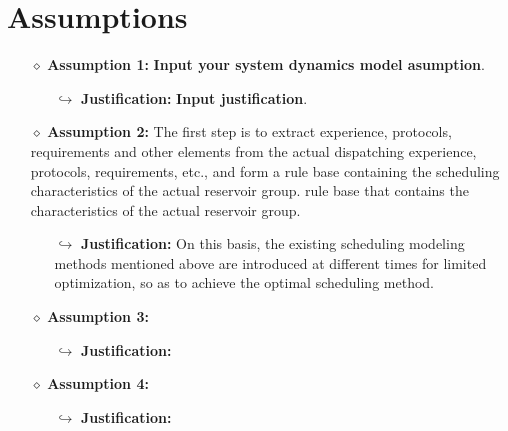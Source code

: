 \section{Assumptions}
\begin{itemize}
  \item[$\diamond$] \textbf{Assumption 1:} \textbf{Input your system dynamics model asumption}.
        \begin{itemize}
          \item[$\hookrightarrow$] \textbf{Justification:} \textbf{Input justification}.
        \end{itemize}
  \item[$\diamond$] \textbf{Assumption 2:} The first step is to extract experience, protocols, requirements and other elements from the actual dispatching experience, protocols, requirements, etc., and form a rule base containing the scheduling characteristics of the actual reservoir group. rule base that contains the characteristics of the actual reservoir group. 
        \begin{itemize}
          \item[$\hookrightarrow$] \textbf{Justification:} On this basis, the existing scheduling modeling methods mentioned above are introduced at different times for limited optimization, so as to achieve the optimal scheduling method.
        \end{itemize}
  \item[$\diamond$] \textbf{Assumption 3:} 
        \begin{itemize}
          \item[$\hookrightarrow$] \textbf{Justification:} 
        \end{itemize}
  \item[$\diamond$] \textbf{Assumption 4:} 
        \begin{itemize}
          \item[$\hookrightarrow$] \textbf{Justification:} 
        \end{itemize}
\end{itemize}